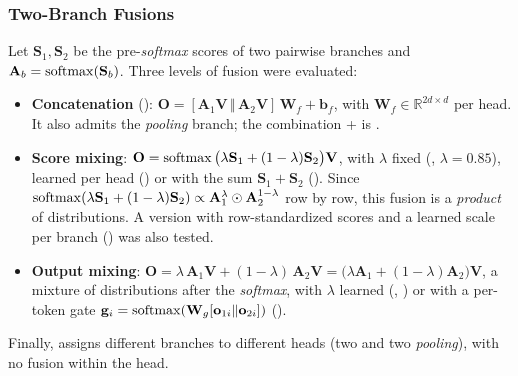 \subsubsection{Two-Branch Fusions}
\label{sec:fusiones}
Let $\mathbf{S}_1,\mathbf{S}_2$ be the pre-\emph{softmax} scores of two pairwise branches and $\mathbf{A}_b=\operatorname{softmax}(\mathbf{S}_b)$. Three levels of fusion were evaluated:
\begin{itemize}
  \item \textbf{Concatenation} (): $\mathbf{O} = [\mathbf{A}_1\mathbf{V}\,\Vert\,\mathbf{A}_2\mathbf{V}]\,\mathbf{W}_f + \mathbf{b}_f$, with $\mathbf{W}_f\in\mathbb{R}^{2d\times d}$ per head. It also admits the \emph{pooling} branch; the combination  +  is .
  \item \textbf{Score mixing}: $\mathbf{O}=\operatorname{softmax}\big(\lambda\mathbf{S}_1 + (1-\lambda)\mathbf{S}_2\big)\mathbf{V}$, with $\lambda$ fixed (, $\lambda=0.85$), learned per head () or with the sum $\mathbf{S}_1+\mathbf{S}_2$ (). Since $\operatorname{softmax}(\lambda\mathbf{S}_1 + (1-\lambda)\mathbf{S}_2) \propto \mathbf{A}_1^{\lambda}\odot\mathbf{A}_2^{1-\lambda}$ row by row, this fusion is a \emph{product} of distributions. A version with row-standardized scores and a learned scale per branch () was also tested.
  \item \textbf{Output mixing}: $\mathbf{O} = \lambda\,\mathbf{A}_1\mathbf{V} + (1-\lambda)\,\mathbf{A}_2\mathbf{V} = \big(\lambda\mathbf{A}_1 + (1-\lambda)\mathbf{A}_2\big)\mathbf{V}$, a mixture of distributions after the \emph{softmax}, with $\lambda$ learned (, ) or with a per-token gate $\mathbf{g}_i = \operatorname{softmax}(\mathbf{W}_g[\mathbf{o}_{1i}\Vert\mathbf{o}_{2i}])$ ().
\end{itemize}
Finally,  assigns different branches to different heads (two  and two \emph{pooling}), with no fusion within the head.

